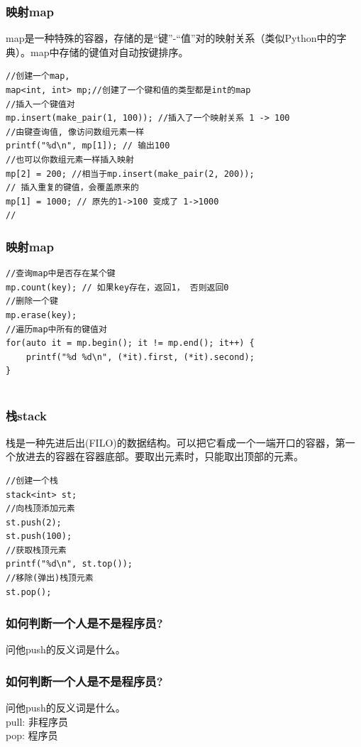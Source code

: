 \documentclass{beamer}
\begin{document}
\begin{frame}[fragile]
    \frametitle{映射map}
    map是一种特殊的容器，存储的是“键”-“值”对的映射关系（类似Python中的字典）。map中存储的键值对自动按键排序。\\
    
    \begin{lstlisting}
//创建一个map, 
map<int, int> mp;//创建了一个键和值的类型都是int的map
//插入一个键值对
mp.insert(make_pair(1, 100)); //插入了一个映射关系 1 -> 100
//由键查询值, 像访问数组元素一样
printf("%d\n", mp[1]); // 输出100
//也可以你数组元素一样插入映射
mp[2] = 200; //相当于mp.insert(make_pair(2, 200));
// 插入重复的键值，会覆盖原来的
mp[1] = 1000; // 原先的1->100 变成了 1->1000
//

    \end{lstlisting}
\end{frame}
    \begin{frame}[fragile]
        \frametitle{映射map}
        
        \begin{lstlisting}
//查询map中是否存在某个键
mp.count(key); // 如果key存在，返回1， 否则返回0
//删除一个键
mp.erase(key);
//遍历map中所有的键值对
for(auto it = mp.begin(); it != mp.end(); it++) {
    printf("%d %d\n", (*it).first, (*it).second);
}
    
        \end{lstlisting}
    

\end{frame}

\begin{frame}[fragile]
    \frametitle{栈stack}
    栈是一种先进后出(FILO)的数据结构。可以把它看成一个一端开口的容器，第一个放进去的容器在容器底部。要取出元素时，只能取出顶部的元素。
    \begin{lstlisting}
//创建一个栈
stack<int> st;
//向栈顶添加元素
st.push(2);
st.push(100);
//获取栈顶元素
printf("%d\n", st.top());
//移除(弹出)栈顶元素
st.pop();

    \end{lstlisting}
    

\end{frame}

\begin{frame}
    \frametitle{如何判断一个人是不是程序员?}
    问他push的反义词是什么。

    

\end{frame}

\begin{frame}
    \frametitle{如何判断一个人是不是程序员?}
    问他push的反义词是什么。\\
    pull: 非程序员\\
    pop: 程序员\\
    

\end{frame}
\end{document}
